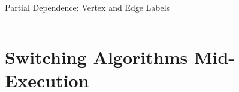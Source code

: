 \documentclass{beamer}
\begin{document}
\begin{frame}{Partial Dependence: Vertex and Edge Labels}
\begin{columns}
\begin{column}{0.5\textwidth}
    \end{column}
  \end{columns}
\end{frame}

\section{Switching Algorithms Mid-Execution}
\end{document}
